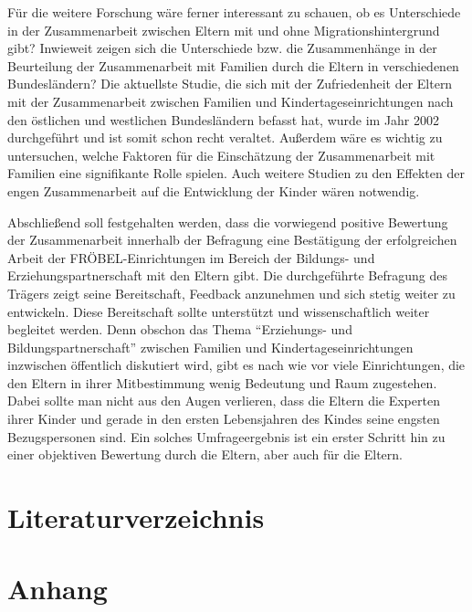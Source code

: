\documentclass[12pt,a4paper]{article}
\begin{document}
	Für die weitere Forschung wäre ferner interessant zu schauen, ob es Unterschiede in  der Zusammenarbeit zwischen Eltern mit und ohne Migrationshintergrund gibt? Inwieweit zeigen sich die Unterschiede bzw. die Zusammenhänge in der Beurteilung der Zusammenarbeit mit Familien durch die Eltern in verschiedenen Bundesländern?  Die aktuellste Studie, die sich mit der Zufriedenheit der Eltern mit der Zusammenarbeit zwischen Familien und Kindertageseinrichtungen nach den östlichen und westlichen Bundesländern befasst hat, wurde im Jahr 2002 durchgeführt und ist somit schon recht veraltet. Außerdem wäre es wichtig zu untersuchen, welche Faktoren für die Einschätzung der Zusammenarbeit mit Familien eine signifikante Rolle spielen. Auch weitere Studien zu den Effekten der engen Zusammenarbeit auf die Entwicklung der Kinder wären notwendig.
	
	Abschließend soll festgehalten werden, dass die vorwiegend positive Bewertung der Zusammenarbeit innerhalb der Befragung eine Bestätigung der erfolgreichen Arbeit der FRÖBEL-Einrichtungen im Bereich der Bildungs- und Erziehungspartnerschaft mit den Eltern gibt. Die durchgeführte Befragung des Trägers zeigt seine Bereitschaft, Feedback anzunehmen und sich stetig weiter zu entwickeln. Diese Bereitschaft sollte unterstützt und wissenschaftlich weiter begleitet werden. Denn obschon das Thema "`Erziehungs- und Bildungspartnerschaft"' zwischen Familien und Kindertageseinrichtungen inzwischen öffentlich diskutiert wird, gibt es nach wie vor viele Einrichtungen, die den Eltern in ihrer Mitbestimmung wenig Bedeutung und Raum zugestehen. Dabei sollte man nicht aus den Augen verlieren, dass die Eltern die Experten ihrer Kinder und gerade in den ersten Lebensjahren des Kindes seine engsten Bezugspersonen sind. Ein solches Umfrageergebnis ist ein erster Schritt hin zu einer objektiven Bewertung durch die Eltern, aber auch für die Eltern.
	
 

\section*{Literaturverzeichnis}



\pagebreak

\begin{appendix}
\section*{Anhang}
\normalsize
\section{}
\end{appendix}
  
\end{document}
